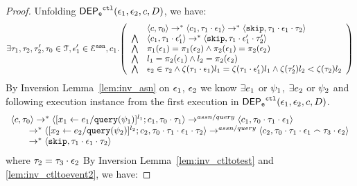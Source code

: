 \begin{proof}
Unfolding $\mathsf{DEP_{\mathtt{e}}}^{\mathtt{{ctl}}}(\mathtt{\epsilon}_1, \mathtt{\epsilon}_2, c, D)$, we have:
%
\[
\exists \vtrace_1, \vtrace_2, \vtrace_2', \vtrace_0 \in \mathcal{T}, 
\event_1' \in \eventset^{\asn}, {c}_1.
\left(
\begin{array}{ll}   
  & \config{{c}, \vtrace_0} \rightarrow^{*} 
    \config{{c}_1, \vtrace_1 \cdot \event_1}  \rightarrow^{*} 
    \config{\eskip,  \vtrace_1 \cdot \event_1 \cdot \vtrace_2} 
  \\ 
  \bigwedge &
  \config{{c}_1, \vtrace_1 \cdot \event_1'}  \rightarrow^{*} 
  \config{\eskip,  \vtrace_1 \cdot \event_1' \cdot \vtrace_2' } 
  \\
  \bigwedge &  \pi_1(\event_1) = \pi_1(\event_2) \land \pi_2(\event_1) = \pi_2(\event_2) \\
  \bigwedge & l_1 = \pi_2(\event_1) \land l_2 = \pi_2(\event_2)
  \\
  \bigwedge & \event_2 \in \trace_2 \land \vcounter(\vtrace_1 \cdot \event_1) l_1 = \vcounter(\vtrace_1 \cdot \event_1')l_1  \land \vcounter(\vtrace_2') l_2 < \vcounter(\trace_2) l_2 
\end{array}
\right)
 \]%
By Inversion Lemma~\ref{lem:inv_asn} on 
 $\mathtt{\epsilon}_1$, $\mathtt{\epsilon}_2$ we know $\exists e_1$ or $\psi_1$, $\exists e_2$ or $\psi_2$ and following execution instance
  from the first execution in $\mathsf{DEP_{\mathtt{e}}}^{\mathtt{{ctl}}}(\mathtt{\epsilon}_1, \mathtt{\epsilon}_2, c, D)$.
\begin{equation}
  \begin{array}{l}   
\langle {c}, \mathtt{\tau}_0 \rangle \rightarrow^{*} 
\langle [\mathrel{ {x}_1 \leftarrow e_1 / {\tt query}(\psi_1) }]^{l_1} ; {c}_1, \mathtt{\tau}_0 \cdot \mathtt{\tau}_1 \rangle  
\rightarrow^{assn/query}
 \langle c_1, \mathtt{\tau}_0 \cdot \mathtt{\tau}_1 \cdot \mathtt{\epsilon}_1 \rangle 
 \\ \qquad 
 \rightarrow^{*} 
  \langle [\mathrel{ {x}_2 \leftarrow e_2 / {\tt query}(\psi_2) }]^{l_2};{c}_2, 
  \mathtt{\tau}_0 \cdot \mathtt{\tau}_1 \cdot \mathtt{\epsilon}_1 \cdot \mathtt{\tau}_2 \rangle 
  \rightarrow^{assn/query} 
  \langle {c}_2,  \mathtt{\tau}_0 \cdot \mathtt{\tau}_1 \cdot \mathtt{\epsilon}_1 \smallfrown \mathtt{\tau}_3 \cdot \mathtt{\epsilon}_2 \rangle 
  \\ \qquad 
  \rightarrow^*
  \langle \mathtt{skip},  \mathtt{\tau}_1 \cdot \mathtt{\epsilon}_1 \cdot \mathtt{\tau}_2 \rangle
\end{array}
\end{equation}
%
where $\mathtt{\tau}_2 = \mathtt{\tau}_3 \cdot \mathtt{\epsilon}_2 $
%
 By {Inversion Lemma~\ref{lem:inv_ctltotest} and \ref{lem:inv_ctltoevent2}}, we have:

\end{proof}
